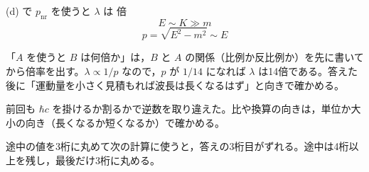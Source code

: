 (d) で $p_{\mathrm{nr}}$ を使うと $\lambda$ は  倍
\[ E\sim K\gg m \]
\[ p=\sqrt{E^{2}-m^{2}}\sim E \]
\item 「$A$ を使うと $B$ は何倍か」は，$B$ と $A$ の関係（比例か反比例か）を先に書いてから倍率を出す。$\lambda\propto1/p$ なので，$p$ が $1/14$ になれば $\lambda$ は14倍である。答えた後に「運動量を小さく見積もれば波長は長くなるはず」と向きで確かめる。
\item {} 前回も $\hbar c$ を掛けるか割るかで逆数を取り違えた。比や換算の向きは，単位か大小の向き（長くなるか短くなるか）で確かめる。
\item {} 途中の値を3桁に丸めて次の計算に使うと，答えの3桁目がずれる。途中は4桁以上を残し，最後だけ3桁に丸める。
